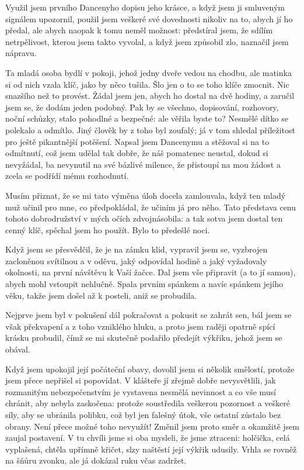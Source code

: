 \documentclass[13pt, a4paper, twoside]{article}
\begin{document}
\onehalfspacing \large
Využil jsem prvního Dancenyho dopisu jeho krásce, a když jsem ji smluveným signálem upozornil, použil jsem veškeré své dovednosti nikoliv na to, abych jí ho předal, ale abych naopak k tomu neměl možnost: předstíral jsem, že sdílím netrpělivost, kterou jsem takto vyvolal, a když jsem způsobil zlo, naznačil jsem nápravu.

Ta mladá osoba bydlí v pokoji, jehož jedny dveře vedou na chodbu, ale matinka si od nich vzala klíč, jako by něco tušila. Šlo jen o to se toho klíče zmocnit. Nic snazšího než to provést. Žádal jsem jen, abych ho dostal na dvě hodiny, a zaručil jsem se, že dodám jeden podobný. Pak by se všechno, dopisování, rozhovory, noční schůzky, stalo pohodlné a bezpečné: ale věřila byste to? Nesmělé dítko se polekalo a odmítlo. Jiný člověk by z toho byl zoufalý; já v tom shledal příležitost pro ještě pikantnější potěšení. Napsal jsem Dancenymu a stěžoval si na to odmítnutí, což jsem udělal tak dobře, že náš pomatenec neustal, dokud si nevyžádal, ba nevynutil na své bázlivé milence, že přistoupí na mou žádost a zcela se podřídí mému rozhodnutí.

Musím přiznat, že se mi tato výměna úloh docela zamlouvala, když ten mladý muž učinil pro mne, co předpokládal, že učiním já pro něho. Tato představa cenu tohoto dobrodružství v mých očích zdvojnásobila: a tak sotva jsem dostal ten cenný klíč, spěchal jsem ho použít. Bylo to předešlé noci.

Když jsem se přesvědčil, že je na zámku klid, vypravil jsem se, vyzbrojen zacloněnou svítilnou a v oděvu, jaký odpovídal hodině a jaký vyžadovaly okolnosti, na první návštěvu k Vaší žačce. Dal jsem vše připravit (a to jí samou), abych mohl vstoupit nehlučně. Spala prvním spánkem a navíc spánkem jejího věku, takže jsem došel až k posteli, aniž se probudila.

Nejprve jsem byl v pokušení dál pokračovat a pokusit se zahrát sen, bál jsem se však překvapení a z toho vzniklého hluku, a proto jsem raději opatrně spící krásku probudil, čímž se mi skutečně podařilo předejít výkřiku, jehož jsem se obával.

Když jsem upokojil její počáteční obavy, dovolil jsem si několik smělostí, protože jsem přece nepřišel si popovídat. V klášteře jí zřejmě dobře nevysvětlili, jak rozmanitým nebezpečenstvím je vystavena nesmělá nevinnost a co vše musí chránit, aby nebyla zaskočena: protože soustředila veškerou pozornost a veškeré síly, aby se ubránila polibku, což byl jen falešný útok, vše ostatní zůstalo bez obrany. Není přece možné toho nevyužít! Změnil jsem proto směr a okamžitě jsem zaujal postavení. V tu chvíli jsme si oba mysleli, že jsme ztraceni: holčička, celá vyplašená, chtěla upřímně křičet, slzy naštěstí její výkřik udusily. Vrhla se rovněž na šňůru zvonku, ale já dokázal ruku včas zadržet.
\end{document}
